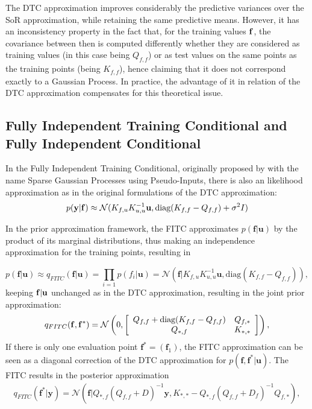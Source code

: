 The DTC approximation improves considerably the predictive variances over the SoR approximation, while retaining the same predictive means. However, it has an inconsistency property in the fact that, for the training values ${\mathbf f}$, the covariance between then is computed differently whether they are considered as training values (in this case being $Q_{f,f}$) or as test values on the same points as the training points (being $K_{f,f}$), hence \cite{Candela_2005} claiming that it does not correspond exactly to a Gaussian Process. In practice, the advantage of it in relation of the DTC approximation compensates for this theoretical issue.


\subsection{Fully Independent Training Conditional and Fully Independent Conditional}

In the Fully Independent Training Conditional, originally proposed by \cite{Snelson_2006} with the name Sparse Gaussian Processes using Pseudo-Inputs, there is also an likelihood approximation as in the original formulations of the DTC approximation: 
\begin{equation}
p({\mathbf y}|{\mathbf f}) \approx \mathcal{N}(K_{f,u}K_{u,u}^{-1} {\mathbf u}, \text{diag}(K_{f,f} - Q_{f,f}) + \sigma^2 I)
\end{equation}

In the prior approximation framework, the FITC approximates $p(\mathbf{f}|\mathbf{u})$ by the product of its marginal distributions, thus making an independence approximation for the training points, resulting in

\begin{equation}
p(\mathbf{f}|\mathbf{u}) \approx q_{FITC}(\mathbf{f}|\mathbf{u}) = \prod_{i=1} p(f_i|\mathbf{u}) = \mathcal{N}(\mathbf{f}|K_{f,u} K_{u,u}^{-1} \mathbf{u},\text{diag}(K_{f,f} - Q_{f,f})), 
\end{equation}
keeping ${\mathbf f}|{\mathbf u}$ unchanged as in the DTC approximation, 
resulting in the joint prior approximation:
\begin{equation}
q_{FITC}(\mathbf{f},\mathbf{f}^*) = \mathcal{N} 
\left( 0 , 
\left[ 
\begin{array}{c c} 
Q_{f,f} + \text{diag}(K_{f,f} - Q_{f,f})& Q_{f,*} \\
Q_{*,f} & K_{*,*}
\end{array} \right]\right),
\end{equation}
If there is only one evaluation point $\mathbf{f}^* = (\mathbf{f}_1)$, the FITC approximation can be seen as a diagonal correction of the DTC approximation for $p(\mathbf{f},\mathbf{f}^*|\mathbf{u})$. The FITC results in the posterior approximation
\begin{equation}\label{fitcpred}
\begin{split}
q_{FITC}(\mathbf{f}^*|\mathbf{y}) = \mathcal{N}(\mathbf{f}| Q_{*,f}(Q_{f,f} + D)^{-1} \mathbf{y}, K_{*,*} - Q_{*,f}(Q_{f,f} + D_f)^{-1} Q_{f,*}),
\end{split}
\end{equation}

